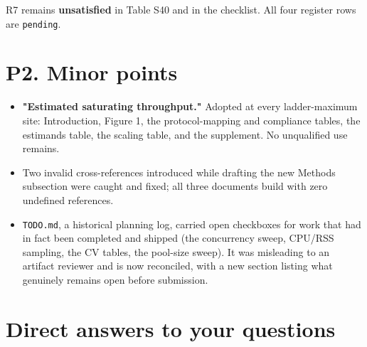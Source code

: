 \documentclass[11pt,a4paper]{article}
\begin{document}
R7 remains \textbf{unsatisfied} in Table S40 and in the checklist. All four register rows are \texttt{pending}.

\section*{P2. Minor points}

\begin{itemize}
  \item \textbf{"Estimated saturating throughput."} Adopted at every ladder-maximum site: Introduction, Figure 1, the protocol-mapping and compliance tables, the estimands table, the scaling table, and the supplement. No unqualified use remains.
  \item Two invalid cross-references introduced while drafting the new Methods subsection were caught and fixed; all three documents build with zero undefined references.
  \item \texttt{TODO.md}, a historical planning log, carried open checkboxes for work that had in fact been completed and shipped (the concurrency sweep, CPU/RSS sampling, the CV tables, the pool-size sweep). It was misleading to an artifact reviewer and is now reconciled, with a new section listing what genuinely remains open before submission.
\end{itemize}

\section*{Direct answers to your questions}
\end{document}
